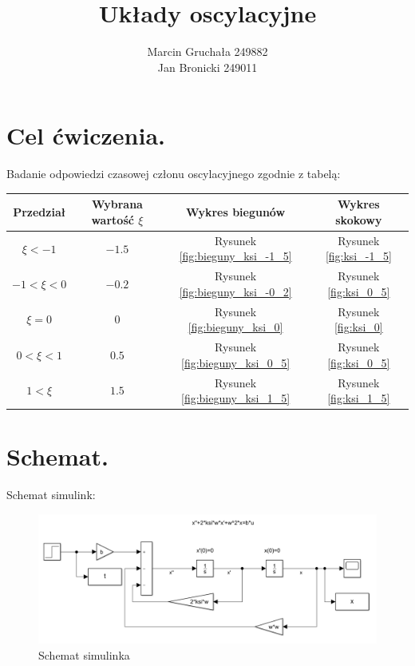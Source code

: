 \documentclass{article}
\title{Układy oscylacyjne}
\author{Marcin Gruchała 249882\\Jan Bronicki 249011\\}
\date{}
\begin{document}
\maketitle

\section{Cel ćwiczenia.}




Badanie odpowiedzi czasowej członu oscylacyjnego zgodnie z tabelą:
\begin{center}
\begin{tabular}{ |c|c|c|c| }
    \hline
    Przedział & Wybrana wartość $\xi$ & Wykres biegunów & Wykres skokowy \\ 
    \hline
    $\xi<-1$    & $-1.5$ & Rysunek \ref{fig:bieguny_ksi_-1_5}   & Rysunek \ref{fig:ksi_-1_5}\\
    \hline
    $-1<\xi<0$  & $-0.2$ & Rysunek \ref{fig:bieguny_ksi_-0_2}   & Rysunek \ref{fig:ksi_0_5}\\ 
    \hline
    $\xi=0$     & $0$    & Rysunek \ref{fig:bieguny_ksi_0}      & Rysunek \ref{fig:ksi_0}\\ 
    \hline
    $0<\xi<1$   & $0.5$  & Rysunek \ref{fig:bieguny_ksi_0_5}    & Rysunek \ref{fig:ksi_0_5}\\ 
    \hline
    $1<\xi$     & $1.5$  & Rysunek \ref{fig:bieguny_ksi_1_5}    & Rysunek \ref{fig:ksi_1_5}\\ 
    \hline
\end{tabular}

\end{center}




\section{Schemat.}
Schemat simulink:\\
 \begin{figure}[h!]
    \centering
    \includegraphics[scale=0.6]{schemat.png}
    \caption{Schemat simulinka}
    \label{fig:schemat}
 \end{figure}
 \newpage
 
\end{document}
